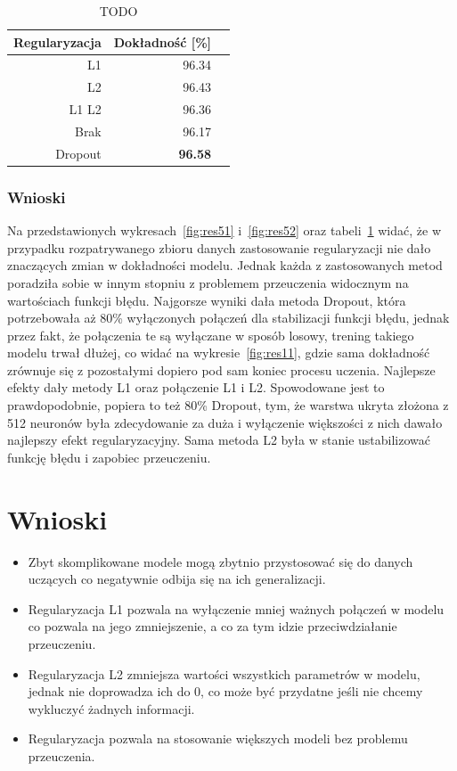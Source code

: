 \documentclass{article}
\begin{document}
\begin{table}[H]
	\caption{TODO}
	\label{tabela-res-51}
	\centering
	\begin{tabular}{rrr}
		\toprule
		Regularyzacja & Dokładność [\%] \\
		\midrule
		L1            & 96.34              \\
		L2            & 96.43              \\
		L1 L2         & 96.36              \\
		Brak          & 96.17              \\
		Dropout       & \textbf{96.58}     \\
		\bottomrule
	\end{tabular}
\end{table}

\subsubsection*{Wnioski}
Na przedstawionych wykresach~\ref{fig:res51} i~\ref{fig:res52} oraz tabeli~\ref{tabela-res-51} widać, że w przypadku rozpatrywanego zbioru danych zastosowanie regularyzacji nie dało znaczących zmian w dokładności modelu. Jednak każda z zastosowanych metod poradziła sobie w innym stopniu z problemem przeuczenia widocznym na wartościach funkcji błędu. Najgorsze wyniki dała metoda Dropout, która potrzebowała aż 80\% wyłączonych połączeń dla stabilizacji funkcji błędu, jednak przez fakt, że połączenia te są wyłączane w sposób losowy, trening takiego modelu trwał dłużej, co widać na wykresie~\ref{fig:res11}, gdzie sama dokładność zrównuje się z pozostałymi dopiero pod sam koniec procesu uczenia. Najlepsze efekty dały metody L1 oraz połączenie L1 i L2. Spowodowane jest to prawdopodobnie, popiera to też 80\% Dropout, tym, że warstwa ukryta złożona z 512 neuronów była zdecydowanie za duża i wyłączenie większości z nich dawało najlepszy efekt regularyzacyjny. Sama metoda L2 była w stanie ustabilizować funkcję błędu i zapobiec przeuczeniu.


\newpage
\section{Wnioski}

\begin{itemize}
	\item Zbyt skomplikowane modele mogą zbytnio przystosować się do danych uczących co negatywnie odbija się na ich generalizacji.
	\item Regularyzacja L1 pozwala na wyłączenie mniej ważnych połączeń w modelu co pozwala na jego zmniejszenie, a co za tym idzie przeciwdziałanie przeuczeniu.
	\item Regularyzacja L2 zmniejsza wartości wszystkich parametrów w modelu, jednak nie doprowadza ich do 0, co może być przydatne jeśli nie chcemy wykluczyć żadnych informacji.
	\item Regularyzacja pozwala na stosowanie większych modeli bez problemu przeuczenia.
\end{itemize}
\end{document}
